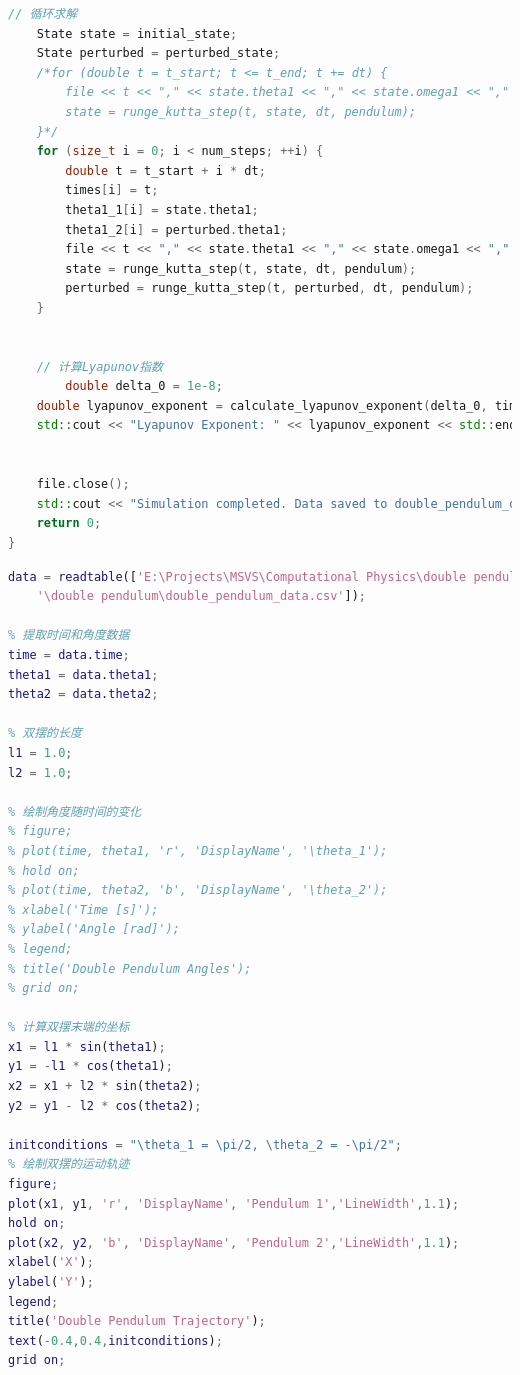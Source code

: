 \documentclass[12pt, a4paper, oneside]{article}
\begin{document}
\begin{lstlisting}[language = C++, name = double_pendulum_main.cpp]
    // 循环求解
    State state = initial_state;
    State perturbed = perturbed_state;
    /*for (double t = t_start; t <= t_end; t += dt) {
        file << t << "," << state.theta1 << "," << state.omega1 << "," << state.theta2 << "," << state.omega2 << "\n";
        state = runge_kutta_step(t, state, dt, pendulum);
    }*/
    for (size_t i = 0; i < num_steps; ++i) {
        double t = t_start + i * dt;
        times[i] = t;
        theta1_1[i] = state.theta1;
        theta1_2[i] = perturbed.theta1;
        file << t << "," << state.theta1 << "," << state.omega1 << "," << state.theta2 << "," << state.omega2 << "\n";
        state = runge_kutta_step(t, state, dt, pendulum);
        perturbed = runge_kutta_step(t, perturbed, dt, pendulum);
    }
   
    
    // 计算Lyapunov指数
        double delta_0 = 1e-8;
    double lyapunov_exponent = calculate_lyapunov_exponent(delta_0, times, theta1_1, theta1_2);
    std::cout << "Lyapunov Exponent: " << lyapunov_exponent << std::endl;


    file.close();
    std::cout << "Simulation completed. Data saved to double_pendulum_data.csv" << std::endl;
    return 0;
}


\end{lstlisting}
\begin{lstlisting}[language = Matlab, name = double pendunlum plot.m]
	data = readtable(['E:\Projects\MSVS\Computational Physics\double pendulum' ...
    '\double pendulum\double_pendulum_data.csv']);

% 提取时间和角度数据
time = data.time;
theta1 = data.theta1;
theta2 = data.theta2;

% 双摆的长度
l1 = 1.0;
l2 = 1.0;

% 绘制角度随时间的变化
% figure;
% plot(time, theta1, 'r', 'DisplayName', '\theta_1');
% hold on;
% plot(time, theta2, 'b', 'DisplayName', '\theta_2');
% xlabel('Time [s]');
% ylabel('Angle [rad]');
% legend;
% title('Double Pendulum Angles');
% grid on;

% 计算双摆末端的坐标
x1 = l1 * sin(theta1);
y1 = -l1 * cos(theta1);
x2 = x1 + l2 * sin(theta2);
y2 = y1 - l2 * cos(theta2);

initconditions = "\theta_1 = \pi/2, \theta_2 = -\pi/2";
% 绘制双摆的运动轨迹
figure;
plot(x1, y1, 'r', 'DisplayName', 'Pendulum 1','LineWidth',1.1);
hold on;
plot(x2, y2, 'b', 'DisplayName', 'Pendulum 2','LineWidth',1.1);
xlabel('X');
ylabel('Y');
legend;
title('Double Pendulum Trajectory');
text(-0.4,0.4,initconditions);
grid on;




\end{lstlisting}
\end{document}

